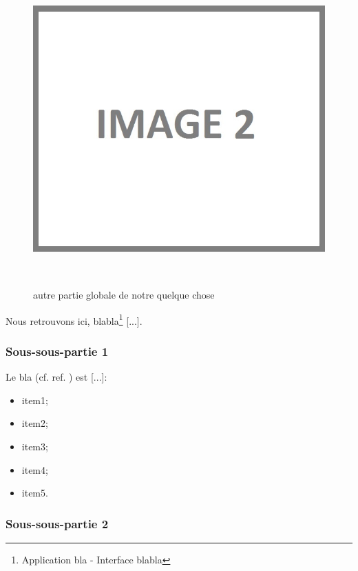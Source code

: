 \begin{figure}[!ht]
\begin{center}
\includegraphics[height=12cm]{autre_partie/image2}
\end{center}
\caption[autre partie]{autre partie globale de notre quelque chose}
\end{figure}

Nous retrouvons ici, blabla\footnote{Application bla - Interface blabla} [...].

\subsubsection{Sous-sous-partie 1}

Le bla (cf. ref. \cite{cite6}) est [...]:

\begin{itemize}
\item item1;
\item item2;
\item item3;
\item item4;
\item item5.
\end{itemize}

\newpage

\subsubsection{Sous-sous-partie 2}

